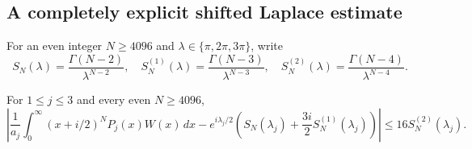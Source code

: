 \subsection{A completely explicit shifted Laplace estimate}

For an even integer $N\ge4096$ and $\lambda\in\{\pi,2\pi,3\pi\}$,
write
\[
 S_N(\lambda)=\frac{\Gamma(N-2)}{\lambda^{N-2}},\quad
 S_N^{(1)}(\lambda)=\frac{\Gamma(N-3)}{\lambda^{N-3}},\quad
 S_N^{(2)}(\lambda)=\frac{\Gamma(N-4)}{\lambda^{N-4}}.
\]

\begin{lemma}\label{gs:Laplace}
For $1\le j\le3$ and every even $N\ge4096$,
\begin{equation}\label{gs:Laplace-bound}
 \left|\frac1{a_j}\int_0^\infty(x+i/2)^NP_j(x)W(x)\,dx
 -e^{i\lambda_j/2}
     \left(S_N(\lambda_j)+\frac{3i}{2}S_N^{(1)}(\lambda_j)\right)
 \right|\le16S_N^{(2)}(\lambda_j).
\end{equation}
\end{lemma}

